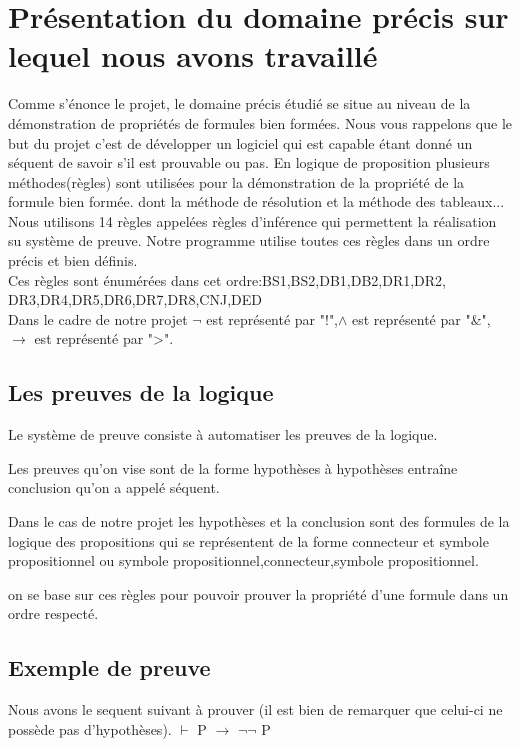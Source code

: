 \documentclass[a4paper,12pt]{article}
\begin{document}
 
 
 \section{Présentation du domaine précis sur lequel nous avons travaillé}
 
 
Comme s'énonce le projet, le domaine précis étudié se situe au niveau de la démonstration de propriétés de formules bien formées.
Nous vous rappelons que le but du projet c'est de développer un logiciel qui est capable étant donné un séquent de savoir s'il est prouvable ou pas. 
En logique de proposition plusieurs méthodes(règles) sont utilisées pour la démonstration de la propriété de la formule bien formée.
dont la méthode de résolution et la méthode des tableaux...
Nous utilisons 14 règles appelées règles d'inférence qui permettent la réalisation su système de preuve.
Notre programme utilise toutes ces règles dans un ordre précis et bien définis.\\
Ces règles sont énumérées dans cet ordre:BS1,BS2,DB1,DB2,DR1,DR2,\\DR3,DR4,DR5,DR6,DR7,DR8,CNJ,DED\\
Dans le cadre de notre projet $\neg$ est représenté par "!",$\wedge$ est représenté par "\&",$\rightarrow$ est représenté par ">".


\subsection{Les preuves de la logique}
Le système de preuve consiste à automatiser les preuves de la logique. 

Les preuves qu'on vise sont de la forme  hypothèses à hypothèses entraîne conclusion qu'on a appelé séquent.

Dans le cas de notre projet les hypothèses et la conclusion sont des formules de la logique des propositions qui se représentent de la forme
connecteur et symbole propositionnel ou symbole propositionnel,connecteur,symbole propositionnel.


on se base sur ces règles  pour pouvoir prouver la propriété d'une formule dans un 
ordre respecté.

\subsection{Exemple de preuve}
Nous avons le sequent suivant à prouver (il est bien de remarquer que celui-ci ne possède pas d'hypothèses). \newline
$\vdash$ P $\rightarrow$ $\neg\neg$ P\\
\end{document}
